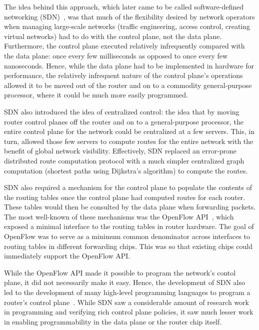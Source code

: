 The idea behind this approach, which later came to be called software-defined
networking (SDN)~\cite{sdn_coining}, was that much of the flexibility desired
by network operators when managing large-scale networks (\eg traffic
engineering, access control, creating virtual networks) had to do with the
control plane, not the data plane.  Furthermore, the control plane executed
relatively infrequently compared with the data plane: once every few
milliseconds as opposed to once every few nanoseconds. Hence, while the data
plane had to be implemented in hardware for performance, the relatively
infrequent nature of the control plane's operations allowed it to be moved out
of the router and on to a commodity general-purpose processor, where it could
be much more easily programmed.

SDN also introduced the idea of centralized control: the idea that by moving
router control planes off the router and on to a general-purpose processor, the
entire control plane for the network could be centralized at a few servers.
This, in turn, allowed those few servers to compute routes for the entire
network with the benefit of global network visibility. Effectively, SDN
replaced an error-prone distributed route computation protocol with a much
simpler centralized graph computation (\eg shortest paths using Dijkstra's
algorithm) to compute the routes.

SDN also required a mechanism for the control plane to populate the contents of
the routing tables once the control plane had computed routes for each router.
These tables would then be consulted by the data plane when forwarding packets.
The most well-known of these mechanisms was the OpenFlow API~\cite{openflow},
which exposed a minimal interface to the routing tables in router hardware.
The goal of OpenFlow was to serve as a minimum common denominator across
interfaces to routing tables in different forwarding chips. This was so that
existing chips could immediately support the OpenFlow API.

While the OpenFlow API made it possible to program the network's contol plane,
it did not necessarily make it easy. Hence, the development of SDN also led to
the development of many high-level programming languages to program a router's
control plane~\cite{frenetic, pyretic}. While SDN saw a considerable amount of
research work in programming and verifying rich control plane policies, it saw
much lesser work in enabling programmability in the data plane or the router
chip itself.

